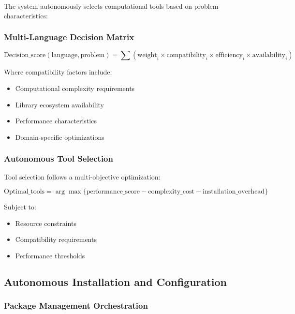 \documentclass[11pt,a4paper]{article}
\begin{document}
The system autonomously selects computational tools based on problem characteristics:

\subsubsection{Multi-Language Decision Matrix}

\begin{equation}
\text{Decision\_score}(\text{language}, \text{problem}) = \sum(\text{weight}_i \times \text{compatibility}_i \times \text{efficiency}_i \times \text{availability}_i)
\end{equation}

Where compatibility factors include:
\begin{itemize}
\item Computational complexity requirements
\item Library ecosystem availability
\item Performance characteristics
\item Domain-specific optimizations
\end{itemize}

\subsubsection{Autonomous Tool Selection}

Tool selection follows a multi-objective optimization:

\begin{equation}
\text{Optimal\_tools} = \arg\max\{\text{performance\_score} - \text{complexity\_cost} - \text{installation\_overhead}\}
\end{equation}

Subject to:
\begin{itemize}
\item Resource constraints
\item Compatibility requirements
\item Performance thresholds
\end{itemize}

\subsection{Autonomous Installation and Configuration}

\subsubsection{Package Management Orchestration}
\end{document}
